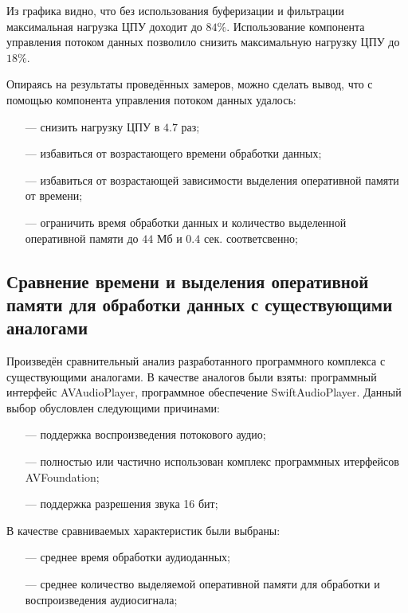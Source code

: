     \par Из графика видно, что без использования буферизации и фильтрации максимальная нагрузка ЦПУ доходит до $84\%$.
    Использование компонента управления потоком данных позволило снизить максимальную нагрузку ЦПУ до $18\%$. 

    \par Опираясь на результаты проведённых замеров, можно сделать вывод, что с помощью компонента управления потоком данных удалось:
    \begin{itemize}
        \item[---] снизить нагрузку ЦПУ в $4.7$ раз;
        \item[---] избавиться от возрастающего времени обработки данных;
        \item[---] избавиться от возрастающей зависимости выделения оперативной памяти от времени;
        \item[---] ограничить время обработки данных и количество выделенной оперативной памяти до $44$ Мб и $0.4$ сек. соответсвенно;
    \end{itemize}

\subsection{Сравнение времени и выделения оперативной памяти для обработки данных с существующими аналогами}
    \par Произведён сравнительный анализ разработанного программного комплекса с существующими аналогами.
    В качестве аналогов были взяты: программный интерфейс AVAudioPlayer, программное обеспечение SwiftAudioPlayer.
    Данный выбор обусловлен следующими причинами:
    \begin{itemize}
        \item[---] поддержка воспроизведения потокового аудио;
        \item[---] полностью или частично использован комплекс программных итерфейсов AVFoundation;
        \item[---] поддержка разрешения звука 16 бит; 
    \end{itemize}
    
    \par В качестве сравниваемых характеристик были выбраны:
    \begin{itemize}
        \item[---] среднее время обработки аудиоданных;
        \item[---] среднее количество выделяемой оперативной памяти для обработки и воспроизведения аудиосигнала;
    \end{itemize}


